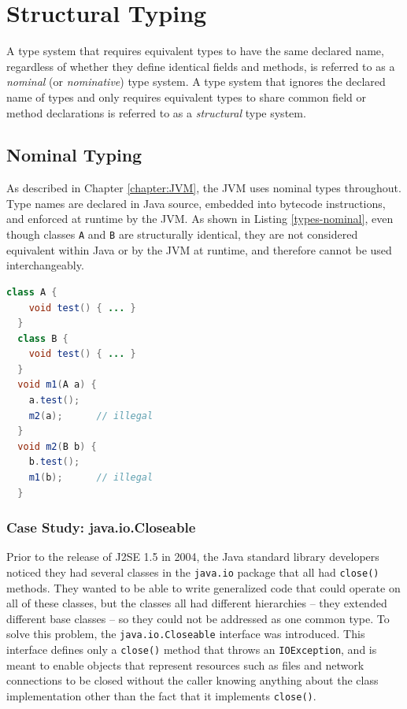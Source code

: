\chapter{Structural Typing}
\label{chapter:StructuralTyping}
\lhead{ \leftmark }

A type system that requires equivalent types to have the same declared name, regardless of whether they define identical fields and methods, is referred to as a \emph{nominal} (or \emph{nominative}) type system.  A type system that ignores the declared name of types and only requires equivalent types to share common field or method declarations is referred to as a \emph{structural} type system.

\section{Nominal Typing}

As described in Chapter \ref{chapter:JVM}, the JVM uses nominal types throughout.  Type names are declared in Java source, embedded into bytecode instructions, and enforced at runtime by the JVM.  As shown in Listing \ref{types-nominal}, even though classes \texttt{A} and \texttt{B} are structurally identical, they are not considered equivalent within Java or by the JVM at runtime, and therefore cannot be used interchangeably.

\begin{lstlisting}[language=Java,caption=Nominal types,label=types-nominal]
  class A {
    void test() { ... }
  }
  class B {
    void test() { ... }
  }
  void m1(A a) {
    a.test();
    m2(a);      // illegal
  }
  void m2(B b) {
    b.test();
    m1(b);      // illegal
  }
\end{lstlisting}


\subsection{Case Study: java.io.Closeable}

Prior to the release of J2SE 1.5 in 2004, the Java standard library developers noticed they had several classes in the \texttt{java.io} package that all had \texttt{close()} methods.  They wanted to be able to write generalized code that could operate on all of these classes, but the classes all had different hierarchies -- they extended different base classes -- so they could not be addressed as one common type.  To solve this problem, the \texttt{java.io.Closeable} interface was introduced.  This interface defines only a \texttt{close()} method that throws an \texttt{IOException}, and is meant to enable objects that represent resources such as files and network connections to be closed without the caller knowing anything about the class implementation other than the fact that it implements \texttt{close()}.

